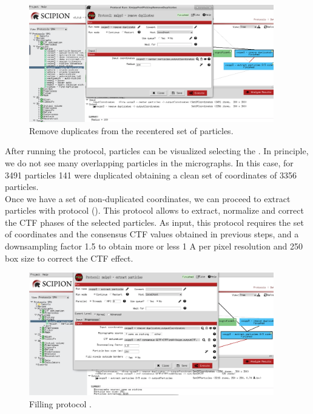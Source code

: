 \begin{figure}[H]
  \centering
  \captionsetup{width=.8\linewidth} 
  \includegraphics[width=0.95\textwidth]
  {images/7d_xmipp3_removeduplicates.pdf}
  \caption{Remove duplicates from the recentered set of particles.}
  \label{fig:xmipp3_removeDup}
  \end{figure}
  


After running the protocol, particles can be visualized selecting the . In principle, we do not see many overlapping particles in the micrographs. In this case, for 3491 particles 141 were duplicated obtaining a clean set of coordinates of 3356 particles.\\

Once we have a set of non-duplicated coordinates, we can proceed to extract particles with  protocol  (). This protocol allows to extract, normalize and correct the CTF phases of the selected particles. As input, this protocol requires the set of coordinates and the consensus CTF values obtained in previous steps, and a downsampling factor 1.5 to obtain more or less 1 A per pixel resolution and 250 box size to correct the CTF effect.

\begin{figure}[H]
  \centering
  \captionsetup{width=.8\linewidth} 
  \includegraphics[width=0.95\textwidth]
  {images/7e_xmipp3_extractparticles.pdf}
  \caption{Filling protocol .}
  \label{fig:xmipp_extract_particles2}
  \end{figure}

